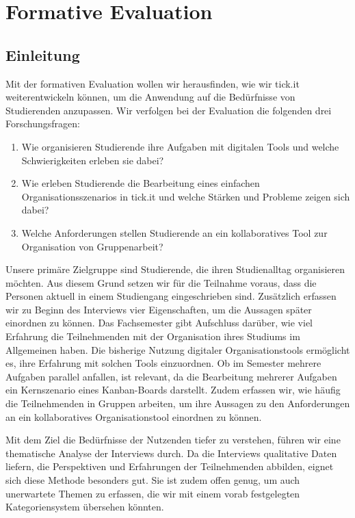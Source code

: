 \chapter{Formative Evaluation}
\label{chap:formative_evaluation}

\section{Einleitung}
\label{sec:pt-einleitung2}

Mit der formativen Evaluation wollen wir herausfinden, wie wir tick.it weiterentwickeln können, um die Anwendung auf die Bedürfnisse von Studierenden anzupassen.
Wir verfolgen bei der Evaluation die folgenden drei Forschungsfragen:

\begin{enumerate}
    \item[\textbf{FF1}] Wie organisieren Studierende ihre Aufgaben mit digitalen Tools und welche Schwierigkeiten erleben sie dabei?
    \item[\textbf{FF2}] Wie erleben Studierende die Bearbeitung eines einfachen Organisationsszenarios in tick.it und welche Stärken und Probleme zeigen sich dabei?
    \item[\textbf{FF3}] Welche Anforderungen stellen Studierende an ein kollaboratives Tool zur Organisation von Gruppenarbeit?
\end{enumerate}

Unsere primäre Zielgruppe sind Studierende, die ihren Studienalltag organisieren möchten.
Aus diesem Grund setzen wir für die Teilnahme voraus, dass die Personen aktuell in einem Studiengang eingeschrieben sind.
Zusätzlich erfassen wir zu Beginn des Interviews vier Eigenschaften, um die Aussagen später einordnen zu können.
Das Fachsemester gibt Aufschluss darüber, wie viel Erfahrung die Teilnehmenden mit der Organisation ihres Studiums im Allgemeinen haben.
Die bisherige Nutzung digitaler Organisationstools ermöglicht es, ihre Erfahrung mit solchen Tools einzuordnen.
Ob im Semester mehrere Aufgaben parallel anfallen, ist relevant, da die Bearbeitung mehrerer Aufgaben ein Kernszenario eines Kanban-Boards darstellt.
Zudem erfassen wir, wie häufig die Teilnehmenden in Gruppen arbeiten, um ihre Aussagen zu den Anforderungen an ein kollaboratives Organisationstool einordnen zu können.

Mit dem Ziel die Bedürfnisse der Nutzenden tiefer zu verstehen, führen wir eine thematische Analyse der Interviews durch.
Da die Interviews qualitative Daten liefern, die Perspektiven und Erfahrungen der Teilnehmenden abbilden, eignet sich diese Methode besonders gut.
Sie ist zudem offen genug, um auch unerwartete Themen zu erfassen, die wir mit einem vorab festgelegten Kategoriensystem übersehen könnten.


